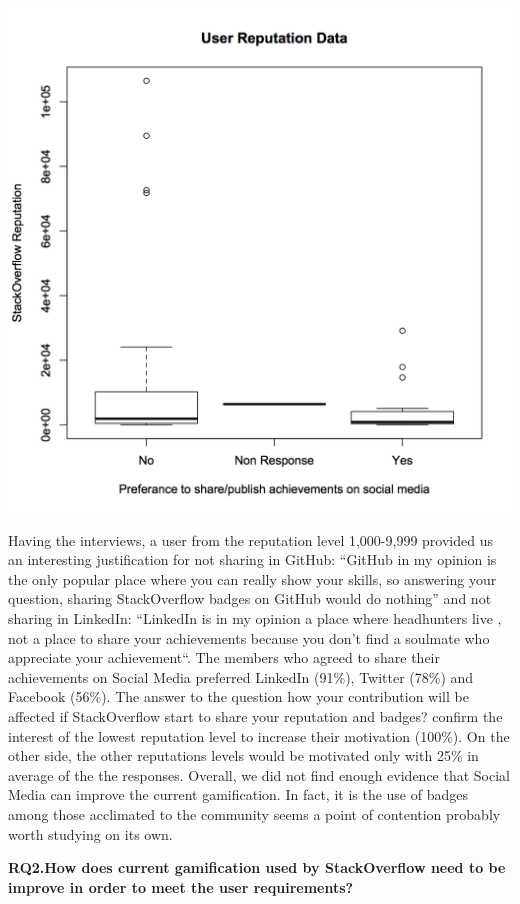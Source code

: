 \documentclass{sigchi}
\begin{document}
\includegraphics[scale=0.5]{figures/boxplot_reputation_compare_publish_reputation_bool.png}

Having the interviews, a user from the reputation level 1,000-9,999 provided us an interesting justification for not sharing in GitHub: “GitHub in my opinion is the only popular place where you can really show your skills, so answering your question, sharing StackOverflow badges on GitHub would do nothing” and not sharing in LinkedIn: “LinkedIn is in my opinion a place where headhunters live , not a place to share your achievements because you don’t find a soulmate who appreciate your achievement“. The members who agreed to share their achievements on Social Media preferred LinkedIn (91\%), Twitter (78\%) and Facebook (56\%). The answer to the question how your contribution will be affected if StackOverflow start to share your reputation and badges? confirm the interest of the lowest reputation level to increase their motivation (100\%). On the other side, the other reputations levels would be motivated only with 25\% in average of the the responses. Overall, we did not find enough evidence that Social Media can improve the current gamification. In fact, it is the use of badges among those acclimated to the community seems a point of contention probably worth studying on its own.

\textbf{RQ2.How does current gamification used by StackOverflow need to be improve in order to meet the user requirements?}
\end{document}
